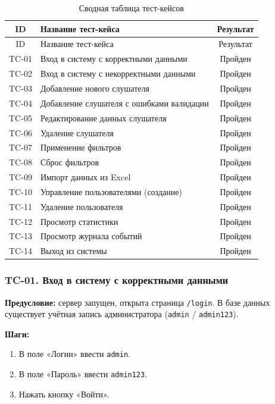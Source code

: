 \begin{xltabular}{\textwidth}{|c|X|c|}
	\caption{Сводная таблица тест-кейсов}\label{tab:testcases_summary}\\ \hline
	\centrow ID & \centrow Название тест-кейса & \centrow Результат \\ \hline
	\endfirsthead
	\centrow ID & \centrow Название тест-кейса & \centrow Результат \\ \hline
	\finishhead
	TC-01 & Вход в систему с корректными данными & Пройден \\ \hline
	TC-02 & Вход в систему с некорректными данными & Пройден \\ \hline
	TC-03 & Добавление нового слушателя & Пройден \\ \hline
	TC-04 & Добавление слушателя с ошибками валидации & Пройден \\ \hline
	TC-05 & Редактирование данных слушателя & Пройден \\ \hline
	TC-06 & Удаление слушателя & Пройден \\ \hline
	TC-07 & Применение фильтров & Пройден \\ \hline
	TC-08 & Сброс фильтров & Пройден \\ \hline
	TC-09 & Импорт данных из Excel & Пройден \\ \hline
	TC-10 & Управление пользователями (создание) & Пройден \\ \hline
	TC-11 & Удаление пользователя & Пройден \\ \hline
	TC-12 & Просмотр статистики & Пройден \\ \hline
	TC-13 & Просмотр журнала событий & Пройден \\ \hline
	TC-14 & Выход из системы & Пройден \\ \hline
\end{xltabular}

\subsubsection{TC-01. Вход в систему с корректными данными}

\textbf{Предусловие:} сервер запущен, открыта страница \texttt{/login}. В базе данных существует учётная запись администратора (\texttt{admin} / \texttt{admin123}).

\textbf{Шаги:}
\begin{enumerate}
	\item В поле «Логин» ввести \texttt{admin}.
	\item В поле «Пароль» ввести \texttt{admin123}.
	\item Нажать кнопку «Войти».
\end{enumerate}

